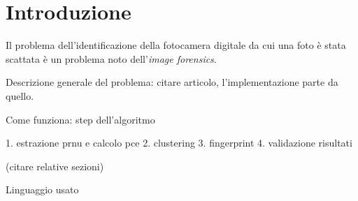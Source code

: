 \section{Introduzione}

Il problema dell'identificazione della fotocamera digitale da cui una foto è stata scattata è un problema noto dell'\emph{image forensics}. 

Descrizione generale del problema: citare articolo, l'implementazione parte da quello.

Come funziona: step dell'algoritmo

1. estrazione prnu e calcolo pce
2. clustering 
3. fingerprint
4. validazione risultati

(citare relative sezioni)

Linguaggio usato